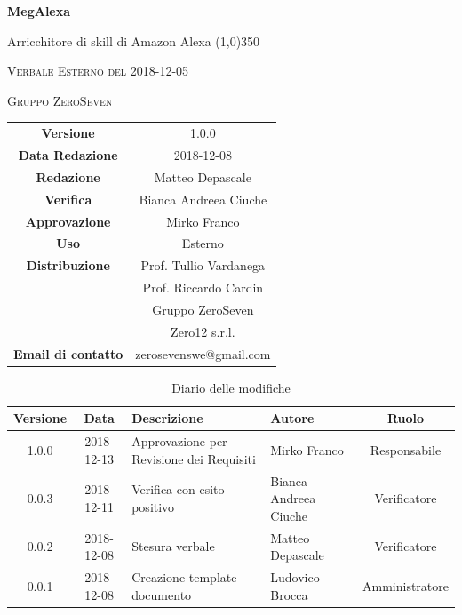 \documentclass[a4paper,12pt]{article}
\author{Matteo Depascale}
\date{2018-12-08}
\begin{document}
\begin{titlepage}
	\centering
	{\huge\bfseries MegAlexa\par}
	Arricchitore di skill di Amazon Alexa
	\line(1,0){350} \\
	{\scshape\LARGE Verbale Esterno del 2018-12-05 \par}
	\vspace{1cm}
	{\scshape Gruppo ZeroSeven \par}
	\logo
	\begin{tabular}{c|c}
		{\hfill \textbf{Versione}} 			& 1.0.0				\\
		{\hfill\textbf{Data Redazione}} 	& 2018-12-08		\\ 
		{\hfill\textbf{Redazione}} 			&  		Matteo Depascale			\\ 
		{\hfill\textbf{Verifica}} 				&  		Bianca Andreea Ciuche		\\ 
		{\hfill\textbf{Approvazione}} 		&  		Mirko Franco	\\ 
		{\hfill\textbf{Uso}} 					& 	Esterno	\\ 
		{\hfill\textbf{Distribuzione}} 			& 			Prof. Tullio Vardanega \\ & Prof. Riccardo Cardin \\ & Gruppo ZeroSeven \\ & Zero12 s.r.l.	\\ 
		{\hfill\textbf{Email di contatto}} & zerosevenswe@gmail.com \\
	\end{tabular}
\end{titlepage}
	

	
	\label{LastFrontPage}
	

	\newpage
	\cleardoublepage
		\begin{table}[tbph]
		\centering
		\begin{tabularx}{\textwidth}{|c|c|X|X|c|}
			\hline
			\textbf{Versione} & \textbf{Data} & \textbf{Descrizione} & \textbf{Autore} & \textbf{Ruolo} \\
			\hline
			1.0.0 & 2018-12-13 & Approvazione per Revisione dei Requisiti & Mirko Franco & Responsabile \\
			\hline
			0.0.3 & 2018-12-11 & Verifica con esito positivo & Bianca Andreea Ciuche & Verificatore \\
			\hline
			0.0.2 & 2018-12-08 & Stesura verbale & Matteo Depascale & Verificatore \\
			\hline
			0.0.1 & 2018-12-08 & Creazione template documento
			& Ludovico Brocca & Amministratore\\
			\hline
		\end{tabularx}
		\caption{Diario delle modifiche}
	\end{table}
	
\end{document}
